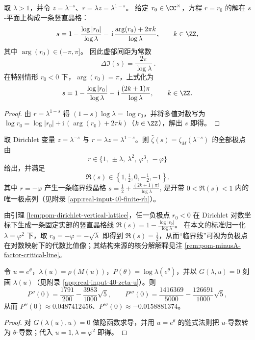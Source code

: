 \begin{lemma}\label{lem:pom-dirichlet-vertical-lattice}
取 \(\lambda>1\)，并令 \(z=\lambda^{-s}\)、\(r=\lambda z=\lambda^{1-s}\)。
给定 \(r_0\in\CC^\times\)，方程 \(r=r_0\) 的解在 \(s\)-平面上构成一条竖直晶格：
\[
s=1-\frac{\log|r_0|}{\log\lambda}-\,\mathrm{i}\,\frac{\arg(r_0)+2\pi k}{\log\lambda},
\qquad k\in\ZZ,
\]
其中 \(\arg(r_0)\in(-\pi,\pi]\)。
因此虚部间距为常数
\[
\boxed{\ \Delta\Im(s)=\frac{2\pi}{\log\lambda}\ }.
\]
在特别情形 \(r_0<0\) 下，\(\arg(r_0)=\pi\)，上式化为
\[
s=1-\frac{\log|r_0|}{\log\lambda}-\,\mathrm{i}\,\frac{(2k+1)\pi}{\log\lambda},
\qquad k\in\ZZ.
\]
\end{lemma}
\begin{proof}
由 \(r=\lambda^{1-s}\) 得
\(
(1-s)\log\lambda=\log r_0
\)，并将多值对数写为
\(
\log r_0=\log|r_0|+\mathrm{i}\,(\arg(r_0)+2\pi k)
\)（\(k\in\ZZ\)），解出 \(s\) 即得。
\end{proof}

\begin{theorem}\label{thm:pom-toy-rh}
取 Dirichlet 变量 $z=\lambda^{-s}$ 与 $r=\lambda z=\lambda^{1-s}$。则 $\widehat{\zeta}(s)=\zeta_M(\lambda^{-s})$ 的全部极点由
\[
r\in\{1,\ \pm\lambda,\ \lambda^2,\ \varphi^3,\ -\varphi\}
\]
给出，并满足
\[
\Re(s)\in\left\{1,\tfrac12,0,-\tfrac12,-1\right\}.
\]
其中 $r=-\varphi$ 产生一条临界线晶格
\(
s=\tfrac12+\frac{(2k+1)\pi i}{\log\lambda}
\),
是开带 $0<\Re(s)<1$ 内的唯一极点列（见附录 \ref{app:real-input-40-finite-rh}）。
\end{theorem}

\begin{remark}\label{rem:pom-toy-rh-critical-line-log}
由引理 \ref{lem:pom-dirichlet-vertical-lattice}，任一负极点 \(r_0<0\) 在 Dirichlet 对数坐标下生成一条固定实部的竖直晶格线
\(
\Re(s)=1-\frac{\log|r_0|}{\log\lambda}
\)。
在本文的标准归一化 \(\lambda=\varphi^2\) 下，取 \(r_0=-\varphi=-\sqrt{\lambda}\) 即得到
\(
\Re(s)=\tfrac12
\)，从而“临界线”可视为负极点在对数映射下的代数比值像；其结构来源的核分解解释见注 \ref{rem:pom-minusA-factor-critical-line}。
\end{remark}

\begin{proposition}\label{prop:pom-pressure-cumulants}
令 $u=e^{\theta}$，$\lambda(u)=\rho(M(u))$，$P(\theta)=\log\lambda(e^\theta)$，并以
\(
G(\lambda,u)=0
\)
刻画 $\lambda(u)$（见附录 \ref{app:real-input-40-zeta-u}）。则
\[
P''(0)=\frac{1791}{200}-\frac{3983}{1000}\sqrt5,
\qquad
P'''(0)=\frac{1416369}{5000}-\frac{126691}{1000}\sqrt5,
\]
从而 $P''(0)\approx 0.0487412456$、$P'''(0)\approx -0.0158881374$。
\end{proposition}
\begin{proof}
对 $G(\lambda(u),u)=0$ 做隐函数求导，并用 $u=e^\theta$ 的链式法则把 $u$-导数转为 $\theta$-导数；代入 $u=1,\lambda=\varphi^2$ 即得。
\end{proof}

